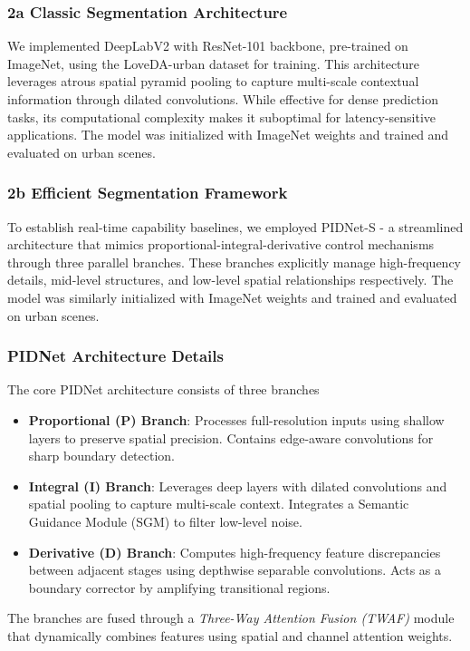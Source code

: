 \documentclass{article}
\begin{document}
\begin{multicols}{2}
\subsubsection{2a Classic Segmentation Architecture } 
We implemented DeepLabV2  \cite{chen2018deeplab}  with ResNet-101 backbone, pre-trained on ImageNet, using the LoveDA-urban dataset for training. This architecture leverages atrous spatial pyramid pooling to capture multi-scale contextual information through dilated convolutions. While effective for dense prediction tasks, its computational complexity makes it suboptimal for latency-sensitive applications. The model was initialized with ImageNet weights and trained and evaluated on urban scenes.

\subsubsection{2b Efficient Segmentation Framework}
To establish real-time capability baselines, we employed PIDNet-S - a streamlined architecture that mimics proportional-integral-derivative control mechanisms through three parallel branches. These branches explicitly manage high-frequency details, mid-level structures, and low-level spatial relationships respectively. The model was similarly initialized with ImageNet weights and trained and evaluated on urban scenes.
\subsubsection{PIDNet Architecture Details}
The core PIDNet architecture \cite{pidnet2023} consists of three branches
\begin{itemize}
	\item \textbf{Proportional (P) Branch}: Processes full-resolution inputs using shallow layers to preserve spatial precision. Contains edge-aware convolutions for sharp boundary detection.
	\item \textbf{Integral (I) Branch}: Leverages deep layers with dilated convolutions and spatial pooling to capture multi-scale context. Integrates a Semantic Guidance Module (SGM) to filter low-level noise.
	\item \textbf{Derivative (D) Branch}: Computes high-frequency feature discrepancies between adjacent stages using depthwise separable convolutions. Acts as a boundary corrector by amplifying transitional regions.
\end{itemize}
The branches are fused through a \textit{Three-Way Attention Fusion (TWAF)} module that dynamically combines features using spatial and channel attention weights.
 

\end{multicols}
\end{document}
